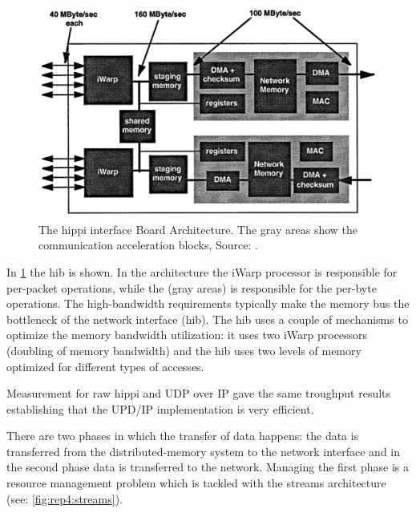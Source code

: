 \begin{figure}
    \centering
	\includegraphics[width=0.95\linewidth]{Figures/Rep4hib.png}
	\caption{The \ac{hippi} interface Board Architecture. The gray areas show the communication acceleration blocks, Source: \cite{steenkiste1997high}.}
    \label{fig:rep4:hib}
\end{figure}

In \cref{fig:rep4:hib} the \ac{hib} is shown.
In the architecture the iWarp processor is responsible for per-packet operations, while the  (gray areas) is responsible for the per-byte operations.
The high-bandwidth requirements typically make the memory bus the bottleneck of the network interface (\ac{hib}).
The \ac{hib} uses a couple of mechanisms to optimize the memory bandwidth utilization: it uses two iWarp processors (doubling of memory bandwidth) and the \ac{hib} uses two levels of memory optimized for different types of accesses.

Measurement for raw \ac{hippi} and UDP over IP gave the same troughput results establishing that the UPD/IP implementation is very efficient.

There are two phases in which the transfer of data happens: the data is transferred from the distributed-memory system to the network interface and in the second phase data is transferred to the network.
Managing the first phase is a resource management problem which is tackled with the streams architecture (see: \cref{fig:rep4:streams}).

